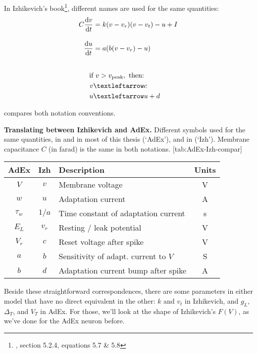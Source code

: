 In Izhikevich's book\footnote{\cite{Izhikevich2007DynamicalSystemsNeuroscience}, section 5.2.4, equations 5.7 \& 5.8}, different names are used for the same quantities:
\begin{align}
    C \d{v} &= k(v - v_r)(v-v_t) - u + I \label{eq:IzhIzh-v} \\[1em]
    \d{u} &= a(b(v-v_r) - u) \\[2em]
    \text{if}&\ v > v_\text{peak},\ \text{then:} \\
    v &← c  \notag \\
    u &← u + d  \notag
\end{align}

 compares both notation conventions.

\begin{table}[h]
    \begin{sidecaption}
        {\textbf{Translating between Izhikevich and AdEx.}
        Different symbols used for the same quantities, in \cite{Brette2005AdaptiveExponentialIntegrateandFirea} and in most of this thesis (`AdEx'), and in \cite{Izhikevich2007DynamicalSystemsNeuroscience} (`Izh').
        Membrane capacitance $C$ (in farad) is the same in both notations.}
        [tab:AdEx-Izh-compar]
        \begin{tabular}{c c l c}
            AdEx   & Izh  & Description & Units \\
            \hline
            $V$  & $v$   & Membrane voltage & V \\
            $w$  & $u$   & Adaptation current & A \\
            $τ_w$  & $1/a$   & Time constant of adaptation current & s \\
            $E_L$  & $v_r$  & Resting / leak potential & V \\
            $V_r$  & $c$  & Reset voltage after spike & V \\
            $a$  & $b$ & Sensitivity of adapt. current to $V$ & S \\
            $b$  & $d$ & Adaptation current bump after spike & A \\
        \end{tabular}
    \end{sidecaption}
\end{table}

Beside these straightforward correspondences, there are some parameters in either model that have no direct equivalent in the other: $k$ and $v_t$ in Izhikevich, and $g_L$, $Δ_T$, and $V_T$ in AdEx.
For those, we'll look at the shape of Izhikevich's $F(V)$, as we've done for the AdEx neuron before.

